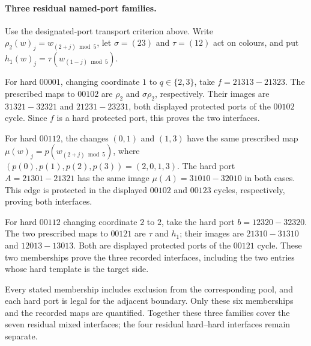 \paragraph{Three residual named-port families.}
Use the designated-port transport criterion above. Write
$\rho_2(w)_j=w_{(2+j)\bmod5}$, let $\sigma=(23)$ and
$\tau=(12)$ act on colours, and put
$h_1(w)_j=\tau(w_{(1-j)\bmod5})$.

For hard $00001$, changing coordinate $1$ to $q\in\{2,3\}$,
take $f=21313\!-21323$. The prescribed maps to $00102$ are
$\rho_2$ and $\sigma\rho_2$, respectively. Their images are
$31321\!-32321$ and $21231\!-23231$, both displayed protected
ports of the $00102$ cycle. Since $f$ is a hard protected port,
this proves the two interfaces.

For hard $00112$, the changes $(0,1)$ and $(1,3)$ have the same
prescribed map $\mu(w)_j=p(w_{(2+j)\bmod5})$, where
$(p(0),p(1),p(2),p(3))=(2,0,1,3)$.
The hard port $A=21301\!-21321$ has the same image
$\mu(A)=31010\!-32010$ in both cases. This edge is protected
in the displayed $00102$ and $00123$ cycles, respectively,
proving both interfaces.

For hard $00112$ changing coordinate $2$ to $2$, take the hard
port $b=12320\!-32320$. The two prescribed maps to $00121$ are
$\tau$ and $h_1$; their images are $21310\!-31310$ and
$12013\!-13013$. Both are displayed protected ports of the
$00121$ cycle. These two memberships prove the three recorded
interfaces, including the two entries whose hard template is the
target side.

Every stated membership includes exclusion from the corresponding
pool, and each hard port is legal for the adjacent boundary.
Only these six memberships and the recorded maps are quantified.
Together these three families cover the seven residual mixed
interfaces; the four residual hard--hard interfaces remain separate.
